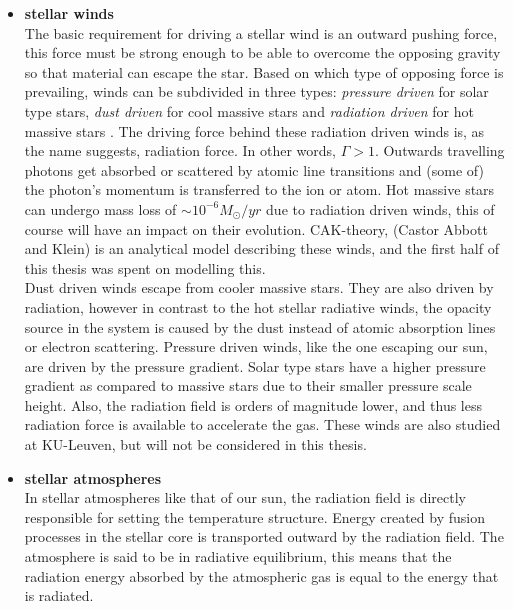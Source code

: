 \begin{itemize}
\item \textbf{stellar winds}\\
The basic requirement for driving a stellar wind is an outward pushing force, this force must be strong enough to be able to overcome the opposing gravity so that material can escape the star. Based on which type of opposing force is prevailing, winds can be subdivided in three types: \emph{pressure driven} for solar type stars, \emph{dust driven} for cool massive stars and \emph{radiation driven} for hot massive stars \citep{Lamers1999}. The driving force behind these radiation driven winds is, as the name suggests, radiation force. In other words, $\Gamma > 1$. Outwards travelling photons get absorbed or scattered by atomic line transitions and (some of) the photon's momentum is transferred to the ion or atom. Hot massive stars can undergo mass loss of $\sim 10^{-6} M_\odot/yr$ due to radiation driven winds, this of course will have an impact on their evolution.
CAK-theory, (Castor Abbott and Klein) is an analytical model describing these winds, and the first half of this thesis was spent on modelling this.\\
Dust driven winds escape from cooler massive stars. They are also driven by radiation, however in contrast to the hot stellar radiative winds, the opacity source in the system is caused by the dust instead of atomic absorption lines or electron scattering. Pressure driven winds, like the one escaping our sun, are driven by the pressure gradient. Solar type stars have a higher pressure gradient as compared to massive stars due to their smaller pressure scale height. Also, the radiation field is orders of magnitude lower, and thus less radiation force is available to accelerate the gas. These winds are also studied at KU-Leuven, but will not be considered in this thesis.


\item \textbf{stellar atmospheres}\\
In stellar atmospheres like that of our sun, the radiation field is directly responsible for setting the temperature structure. Energy created by fusion processes in the stellar core is transported outward by the radiation field. The atmosphere is said to be in radiative equilibrium, this means that the radiation energy absorbed by the atmospheric gas is equal to the energy that is radiated. 


\end{itemize}
